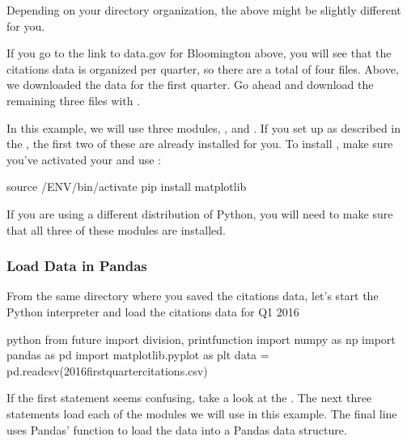 Depending on your directory organization, the above might be slightly
different for you.

If you go to the link to data.gov for Bloomington above, you will see
that the citations data is organized per quarter, so there are a total
of four files. Above, we downloaded the data for the first quarter. Go
ahead and download the remaining three files with .

In this example, we will use three modules, ,  and
. If you set up  as described in the
{\hyperref[\detokenize{lesson/prg/python_intro::doc}]{}}, the first two of these are
already installed for you. To install , make sure you've
activated your  and use :

\begin{sphinxVerbatim}[commandchars=\\\{\}]
\PYGZdl{} source \PYGZti{}/ENV/bin/activate
\PYGZdl{} pip install matplotlib
\end{sphinxVerbatim}

If you are using a different distribution of Python, you will need to
make sure that all three of these modules are installed.


\subsubsection{Load Data in Pandas}
\label{\detokenize{lesson/prg/python_big_data:load-data-in-pandas}}
From the same directory where you saved the citations data, let's
start the Python interpreter and load the citations data for Q1 2016

\begin{sphinxVerbatim}[commandchars=\\\{\}]
\PYGZdl{} python
\PYGZgt{}\PYGZgt{}\PYGZgt{} from \PYGZus{}\PYGZus{}future\PYGZus{}\PYGZus{} import division, print\PYGZus{}function
\PYGZgt{}\PYGZgt{}\PYGZgt{} import numpy as np
\PYGZgt{}\PYGZgt{}\PYGZgt{} import pandas as pd
\PYGZgt{}\PYGZgt{}\PYGZgt{} import matplotlib.pyplot as plt
\PYGZgt{}\PYGZgt{}\PYGZgt{} data = pd.read\PYGZus{}csv(\PYGZsq{}2016\PYGZhy{}first\PYGZhy{}quarter\PYGZhy{}citations.csv\PYGZsq{})
\end{sphinxVerbatim}

If the first  statement seems confusing, take a look at the
{\hyperref[\detokenize{lesson/prg/python_intro::doc}]{}}. The next three 
statements load each of the modules we will use in this example. The
final line uses Pandas'  function to load the data into a
Pandas  data structure.


